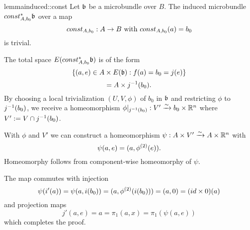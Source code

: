 \begin{mystatement}{lemma}{induced::const}
    Let $\bb$ be a microbundle over $B$. The induced microbundle $\ind{const_{A, b_0}}\bb$ over a map
    \[ const_{A, b_0}: A \to B \text{ with } const_{A, b_0}(a) = b_0 \]
    is trivial.
\end{mystatement}

\begin{myproof}
    The total space $E(\ind{const_{A, b_0}}\bb)$ is of the form
    \[ \set{(a, e) \in A \cross E(\bb)}{f(a) = b_0 = j(e)} \]
    \[ = A \times j^{-1}(b_0). \]
    By choosing a local trivialization $(U, V, \phi)$ of $b_0$ in $\bb$ and restricting $\phi$ to $j^{-1}(b_0)$,
    we receive a homeomorphism $\phi\vert_{j^{-1}(b_0)}: V' \xrightarrow{\sim} b_0 \times \mathbb{R}^n$ where $V' := V \cap j^{-1}(b_0)$.
    
    With $\phi$ and $V'$ we can construct a homeomorphism $\psi: A \times V' \xrightarrow{\sim} A \times \mathbb{R}^n$ with
    \[ \psi(a, e) = (a, \phi^{(2)}(e)). \]
    Homeomorphy follows from component-wise homeomorphy of $\psi$.

    The map commutes with injection
    \[ \psi(i'(a)) = \psi(a, i(b_0)) = (a, \phi^{(2)}(i(b_0))) = (a, 0) = (id \times 0)(a) \]
    and projection maps
    \[ j'(a, e) = a = \pi_1(a, x) = \pi_1(\psi(a, e)) \]
    which completes the proof.
\end{myproof}